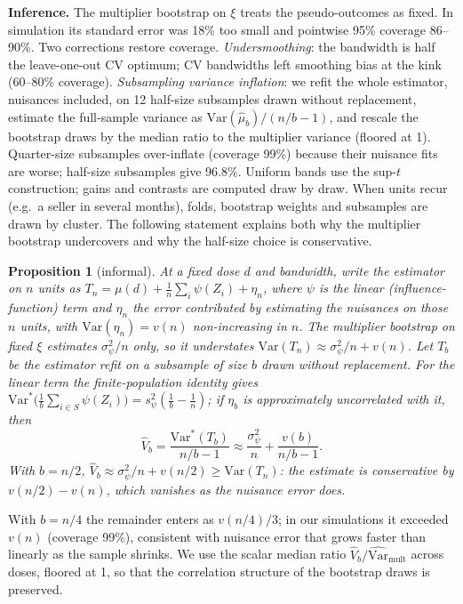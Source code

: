 \documentclass[sigconf,anonymous,review]{acmart}
\newtheorem{proposition}{Proposition}
\begin{document}
\textbf{Inference.} The multiplier bootstrap on $\xi$ treats the pseudo-outcomes as fixed. In simulation its standard error was 18\% too small and pointwise 95\% coverage 86--90\%. Two corrections restore coverage. \emph{Undersmoothing}: the bandwidth is half the leave-one-out CV optimum; CV bandwidths left smoothing bias at the kink (60--80\% coverage). \emph{Subsampling variance inflation}: we refit the whole estimator, nuisances included, on 12 half-size subsamples drawn without replacement, estimate the full-sample variance as $\mathrm{Var}(\hat\mu_b)/(n/b-1)$, and rescale the bootstrap draws by the median ratio to the multiplier variance (floored at 1). Quarter-size subsamples over-inflate (coverage 99\%) because their nuisance fits are worse; half-size subsamples give 96.8\%. Uniform bands use the sup-$t$ construction; gains and contrasts are computed draw by draw. When units recur (e.g.\ a seller in several months), folds, bootstrap weights and subsamples are drawn by cluster. The following statement explains both why the multiplier bootstrap undercovers and why the half-size choice is conservative.

\begin{proposition}[informal]\label{prop:vif}
At a fixed dose $d$ and bandwidth, write the estimator on $n$ units as $T_n=\mu(d)+\frac1n\sum_{i}\psi(Z_i)+\eta_n$, where $\psi$ is the linear (influence-function) term and $\eta_n$ the error contributed by estimating the nuisances on those $n$ units, with $\mathrm{Var}(\eta_n)=v(n)$ non-increasing in $n$. The multiplier bootstrap on fixed $\xi$ estimates $\sigma_\psi^2/n$ only, so it understates $\mathrm{Var}(T_n)\approx\sigma_\psi^2/n+v(n)$. Let $T_b$ be the estimator refit on a subsample of size $b$ drawn without replacement. For the linear term the finite-population identity gives $\mathrm{Var}^*\big(\tfrac1b\sum_{i\in S}\psi(Z_i)\big)=s_\psi^2(\tfrac1b-\tfrac1n)$; if $\eta_b$ is approximately uncorrelated with it, then
\[\hat V_b=\frac{\mathrm{Var}^*(T_b)}{n/b-1}\approx\frac{\sigma_\psi^2}{n}+\frac{v(b)}{n/b-1}.\]
With $b=n/2$, $\hat V_b\approx\sigma_\psi^2/n+v(n/2)\ge\mathrm{Var}(T_n)$: the estimate is conservative by $v(n/2)-v(n)$, which vanishes as the nuisance error does.
\end{proposition}

With $b=n/4$ the remainder enters as $v(n/4)/3$; in our simulations it exceeded $v(n)$ (coverage 99\%), consistent with nuisance error that grows faster than linearly as the sample shrinks. We use the scalar median ratio $\hat V_b/\widehat{\mathrm{Var}}_{\mathrm{mult}}$ across doses, floored at 1, so that the correlation structure of the bootstrap draws is preserved.
\end{document}
